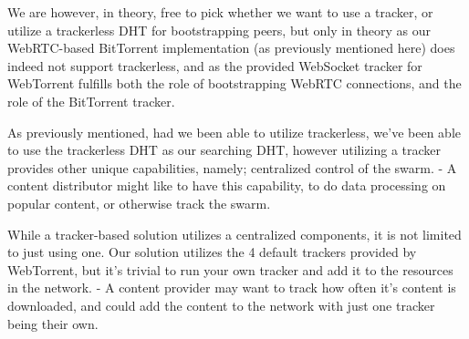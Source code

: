We are however, in theory, free to pick whether we want to use a tracker, or 
utilize a trackerless \acs{DHT} for bootstrapping peers, but only in theory as our
WebRTC-based BitTorrent implementation (as previously mentioned here) does
indeed not support trackerless, and as the provided WebSocket tracker for 
WebTorrent fulfills both the role of bootstrapping WebRTC connections, and the
role of the BitTorrent tracker.

As previously mentioned, had we been able to utilize trackerless, we've been
able to use the trackerless \acs{DHT} as our searching \acs{DHT}, however utilizing a
tracker provides other unique capabilities, namely; centralized control of the
swarm. 
\newline
- A content distributor might like to have this capability, to do data
processing on popular content, or otherwise track the swarm.

While a tracker-based solution utilizes a centralized components, it is not
limited to just using one. Our solution utilizes the 4 default trackers
provided by WebTorrent, but it's trivial to run your own tracker and add it to
the resources in the network.
\newline
- A content provider may want to track how often it's content is downloaded,
and could add the content to the network with just one tracker being their own.
